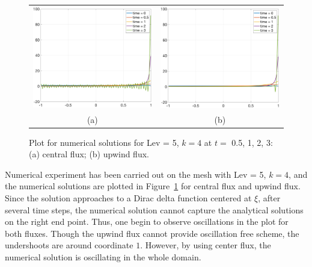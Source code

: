 \documentclass[preprint,11pt]{elsarticle}
\begin{document}
\begin{figure}[H]
\begin{tabular}{cc}
  \includegraphics[width=.45\textwidth,height=.4\textwidth]{./NumFig/Test1-CF-L5D5}
  &\includegraphics[width=.45\textwidth,height=.4\textwidth]{./NumFig/Test1-UF-L5D5}\\
  (a) & (b)
  \end{tabular}
  \caption{Plot for numerical solutions for Lev = 5, $k = 4$ at $t = $ 0.5, 1, 2, 3: (a) central flux; (b) upwind flux.}\label{Fig:Pitch_E_1-Num2}
\end{figure}

Numerical experiment has been carried out on the mesh with Lev = 5, $k = 4$, and the numerical solutions are plotted in Figure~\ref{Fig:Pitch_E_1-Num2} for central flux and upwind flux. Since the solution approaches to a Dirac delta function centered at $\xi$, after several time steps, the numerical solution cannot capture the analytical solutions on the right end point. Thus, one begin to observe oscillations in the plot for both fluxes. Though the upwind flux cannot provide oscillation free scheme, the undershoots are around coordinate $1$. However, by using center flux, the numerical solution is oscillating in the whole domain.

\end{document}
